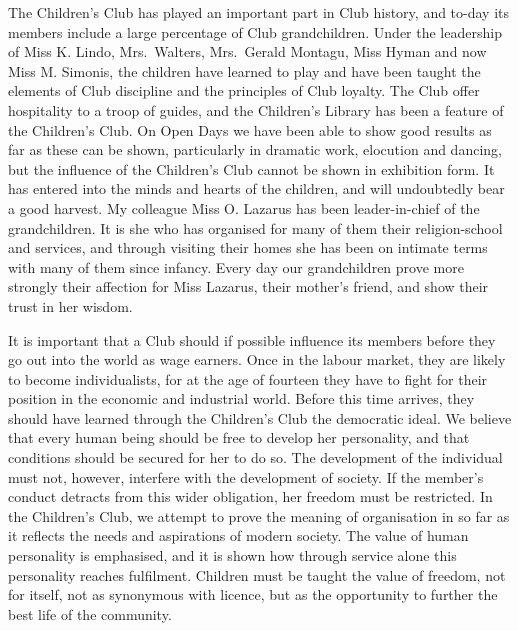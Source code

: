 The Children’s Club has played an important part in
Club history, and to-day its members include a large percentage
of Club grandchildren. Under the leadership of
Miss K. Lindo, Mrs.\ Walters, Mrs.\ Gerald Montagu,
Miss Hyman and now Miss M. Simonis, the children have
learned to play and have been taught the elements of
Club discipline and the principles of Club loyalty. The
Club offer hospitality to a troop of guides, and the Children’s
Library has been a feature of the Children’s Club.
On Open Days we have been able to show good results
as far as these can be shown, particularly in dramatic
work, elocution and dancing, but the influence of the
Children’s Club cannot be shown in exhibition form. It
has entered into the minds and hearts of the children, and
will undoubtedly bear a good harvest. My colleague
Miss O. Lazarus has been leader-in-chief of the grandchildren.
It is she who has organised for many of them
their religion-school and services, and through visiting
their homes she has been on intimate terms with many
of them since infancy. Every day our grandchildren
prove more strongly their affection for Miss Lazarus,
their mother’s friend, and show their trust in her
wisdom.

It is important that a Club should if possible influence
its members before they go out into the world as wage
earners. Once in the labour market, they are likely to
become individualists, for at the age of fourteen they have
to fight for their position in the economic and industrial
world. Before this time arrives, they should have learned
through the Children’s Club the democratic ideal. We
believe that every human being should be free to develop
her personality, and that conditions should be secured for
her to do so. The development of the individual must not,
however, interfere with the development of society. If the
member’s conduct detracts from this wider obligation, her
freedom must be restricted. In the Children’s Club, we
attempt to prove the meaning of organisation in so far as
it reflects the needs and aspirations of modern society. The
value of human personality is emphasised, and it is shown
how through service alone this personality reaches fulfilment.
Children must be taught the value of freedom, not
for itself, not as synonymous with licence, but as the
opportunity to further the best life of the community.
